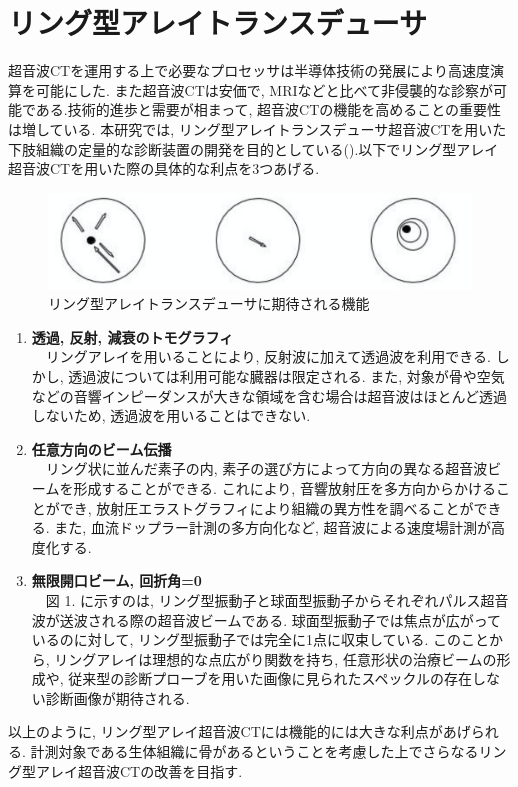 \section{リング型アレイトランスデューサ} 
超音波CTを運用する上で必要なプロセッサは半導体技術の発展により高速度演算を可能にした. また超音波CTは安価で, MRIなどと比べて非侵襲的な診察が可能である.技術的進歩と需要が相まって, 超音波CTの機能を高めることの重要性は増している.  本研究では, リング型アレイトランスデューサ超音波CTを用いた下肢組織の定量的な診断装置の開発を目的としている().以下でリング型アレイ超音波CTを用いた際の具体的な利点を3つあげる\cite{senpai}.
\begin{figure}[h]
  \begin{center}
    \includegraphics[width=120mm]{fig/three.pdf}
  \end{center}
  \caption{リング型アレイトランスデューサに期待される機能}
\end{figure}
\begin{enumerate}
\item{\bf 透過, 反射, 減衰のトモグラフィ}
\\\ \ リングアレイを用いることにより, 反射波に加えて透過波を利用できる. しかし, 透過波については利用可能な臓器は限定される. また, 対象が骨や空気などの音響インピーダンスが大きな領域を含む場合は超音波はほとんど透過しないため, 透過波を用いることはできない. 
\item{\bf 任意方向のビーム伝播}
\\\ \ リング状に並んだ素子の内, 素子の選び方によって方向の異なる超音波ビームを形成することができる. これにより, 音響放射圧を多方向からかけることができ, 放射圧エラストグラフィにより組織の異方性を調べることができる. また, 血流ドップラー計測の多方向化など, 超音波による速度場計測が高度化する. 
\item{\bf 無限開口ビーム, 回折角=0}
\\\ \ 図 1. に示すのは, リング型振動子と球面型振動子からそれぞれパルス超音波が送波される際の超音波ビームである. 球面型振動子では焦点が広がっているのに対して, リング型振動子では完全に1点に収束している. このことから, リングアレイは理想的な点広がり関数を持ち, 任意形状の治療ビームの形成や, 従来型の診断プローブを用いた画像に見られたスペックルの存在しない診断画像が期待される. 
\end{enumerate} 
以上のように, リング型アレイ超音波CTには機能的には大きな利点があげられる.  計測対象である生体組織に骨があるということを考慮した上でさらなるリング型アレイ超音波CTの改善を目指す. 

